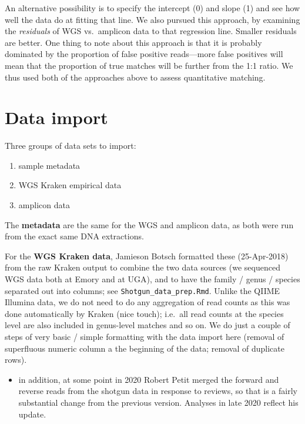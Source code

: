 \documentclass[
]{article}
\providecommand{\tightlist}{%
  \setlength{\itemsep}{0pt}\setlength{\parskip}{0pt}}
\begin{document}
An alternative possibility is to specify the intercept (0) and slope (1)
and see how well the data do at fitting that line. We also pursued this
approach, by examining the \emph{residuals} of WGS vs.~amplicon data to
that regression line. Smaller residuals are better. One thing to note
about this approach is that it is probably dominated by the proportion
of false positive reads---more false positives will mean that the
proportion of true matches will be further from the 1:1 ratio. We thus
used both of the approaches above to assess quantitative matching.

\hypertarget{data-import}{%
\section{Data import}\label{data-import}}

Three groups of data sets to import:

\begin{enumerate}
\def\labelenumi{\arabic{enumi}.}
\tightlist
\item
  sample metadata
\item
  WGS Kraken empirical data
\item
  amplicon data
\end{enumerate}

The \textbf{metadata} are the same for the WGS and amplicon data, as
both were run from the exact same DNA extractions.

For the \textbf{WGS Kraken data}, Jamieson Botsch formatted these
(25-Apr-2018) from the raw Kraken output to combine the two data sources
(we sequenced WGS data both at Emory and at UGA), and to have the family
/ genus / species separated out into columns; see
\texttt{Shotgun\_data\_prep.Rmd}. Unlike the QIIME Illumina data, we do
not need to do any aggregation of read counts as this was done
automatically by Kraken (nice touch); i.e.~all read counts at the
species level are also included in genus-level matches and so on. We do
just a couple of steps of very basic / simple formatting with the data
import here (removal of superfluous numeric column a the beginning of
the data; removal of duplicate rows).

\begin{itemize}
\tightlist
\item
  in addition, at some point in 2020 Robert Petit merged the forward and
  reverse reads from the shotgun data in response to reviews, so that is
  a fairly substantial change from the previous version. Analyses in
  late 2020 reflect his update.
\end{itemize}
\end{document}
